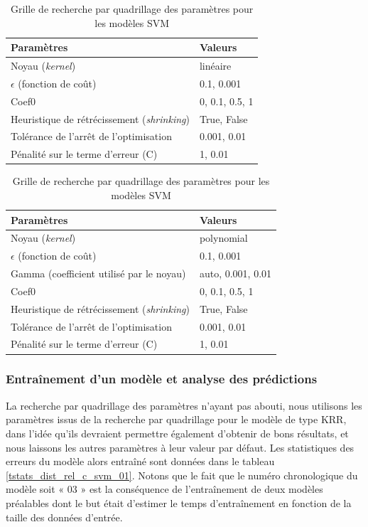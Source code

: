 \begin{table}
	\centering
	
	\begin{tabular}{|l|l|}
		\hline
		\textbf{Paramètres} & \textbf{Valeurs} \\ \hline 
		Noyau (\emph{kernel}) & linéaire\\ \hline
		$\epsilon$ (fonction de coût) & 0.1, 0.001 \\ \hline
		Coef0 & 0, 0.1, 0.5, 1 \\ \hline
		Heuristique de rétrécissement (\emph{shrinking}) & True, False \\ \hline
		Tolérance de l'arrêt de l'optimisation & 0.001, 0.01 \\ \hline
		Pénalité sur le terme d'erreur (C) & 1, 0.01\\ \hline
	\end{tabular}
	
	\vspace{0.5cm}	

	\begin{tabular}{|l|l|}
		\hline
		\textbf{Paramètres} & \textbf{Valeurs} \\ \hline 
		Noyau (\emph{kernel}) & polynomial\\ \hline
		$\epsilon$ (fonction de coût) & 0.1, 0.001 \\ \hline
		Gamma (coefficient utilisé par le noyau) & auto, 0.001, 0.01 \\ \hline
		Coef0 & 0, 0.1, 0.5, 1 \\ \hline
		Heuristique de rétrécissement (\emph{shrinking}) & True, False \\ \hline
		Tolérance de l'arrêt de l'optimisation & 0.001, 0.01 \\ \hline
		Pénalité sur le terme d'erreur (C) & 1, 0.01\\ \hline
	\end{tabular}		
	
	\caption{Grille de recherche par quadrillage des paramètres pour les modèles SVM}
	\label{tgrille_quadri_dist_rel_c_svm_01}
\end{table}

\subsubsection{Entraînement d'un modèle et analyse des prédictions}
\par La recherche par quadrillage des paramètres n'ayant pas abouti, nous utilisons les paramètres issus de la recherche par quadrillage pour le modèle de type KRR, dans l'idée qu'ils devraient permettre également d'obtenir de bons résultats, et nous laissons les autres paramètres à leur valeur par défaut. Les statistiques des erreurs du modèle alors entraîné sont données dans le tableau \ref{tstats_dist_rel_c_svm_01}. Notons que le fait que le numéro chronologique du modèle soit « 03 » est la conséquence de l'entraînement de deux modèles préalables dont le but était d'estimer le temps d'entraînement en fonction de la taille des données d'entrée.\\

